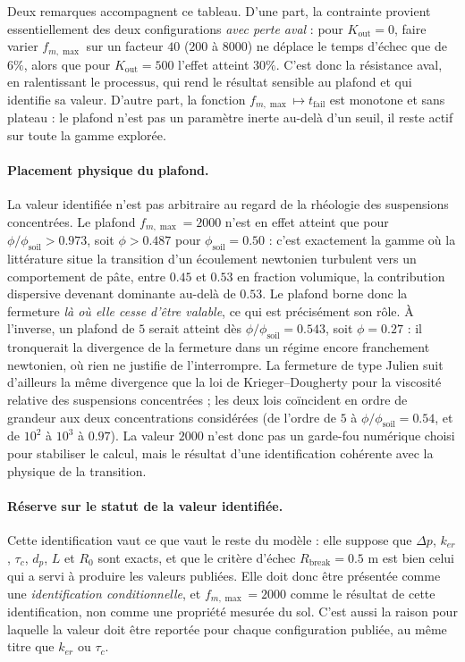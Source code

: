 \documentclass[11pt,a4paper]{report}
\newcommand{\phisol}{\phi_{\mathrm{soil}}}
\newcommand{\kout}{K_{\mathrm{out}}}
\begin{document}
Deux remarques accompagnent ce tableau. D'une part, la contrainte provient essentiellement des deux
configurations \emph{avec perte aval} : pour \(\kout = 0\), faire varier \(f_{m,\max}\) sur un facteur
\(40\) (\(200\) à \(8000\)) ne déplace le temps d'échec que de \(6\%\), alors que pour \(\kout = 500\)
l'effet atteint \(30\%\). C'est donc la résistance aval, en ralentissant le processus, qui rend le résultat
sensible au plafond et qui identifie sa valeur. D'autre part, la fonction \(f_{m,\max} \mapsto
t_{\mathrm{fail}}\) est monotone et sans plateau : le plafond n'est pas un paramètre inerte au-delà d'un
seuil, il reste actif sur toute la gamme explorée.

\paragraph{Placement physique du plafond.} La valeur identifiée n'est pas arbitraire au regard de la
rhéologie des suspensions concentrées. Le plafond \(f_{m,\max} = 2000\) n'est en effet atteint que pour
\(\phi/\phisol > 0.973\), soit \(\phi > 0.487\) pour \(\phisol = 0.50\) : c'est exactement la gamme où la
littérature situe la transition d'un écoulement newtonien turbulent vers un comportement de pâte, entre
\(0.45\) et \(0.53\) en fraction volumique, la contribution dispersive devenant dominante au-delà de
\(0.53\). Le plafond borne donc la fermeture \emph{là où elle cesse d'être valable}, ce qui est
précisément son rôle. À l'inverse, un plafond de \(5\) serait atteint dès \(\phi/\phisol = 0.543\), soit
\(\phi = 0.27\) : il tronquerait la divergence de la fermeture dans un régime encore franchement
newtonien, où rien ne justifie de l'interrompre. La fermeture de type Julien suit d'ailleurs la même
divergence que la loi de Krieger--Dougherty pour la viscosité relative des suspensions concentrées ; les
deux lois coïncident en ordre de grandeur aux deux concentrations considérées (de l'ordre de \(5\) à
\(\phi/\phisol = 0.54\), et de \(10^{2}\) à \(10^{3}\) à \(0.97\)). La valeur \(2000\) n'est donc pas un
garde-fou numérique choisi pour stabiliser le calcul, mais le résultat d'une identification cohérente avec
la physique de la transition.

\paragraph{Réserve sur le statut de la valeur identifiée.} Cette identification vaut ce que vaut le reste
du modèle : elle suppose que \(\Delta p\), \(k_{er}\), \(\tau_c\), \(d_p\), \(L\) et \(R_0\) sont exacts, et
que le critère d'échec \(R_{\mathrm{break}} = 0.5\) m est bien celui qui a servi à produire les valeurs
publiées. Elle doit donc être présentée comme une \emph{identification conditionnelle}, et
\(f_{m,\max} = 2000\) comme le résultat de cette identification, non comme une propriété mesurée du sol.
C'est aussi la raison pour laquelle la valeur doit être reportée pour chaque configuration publiée, au
même titre que \(k_{er}\) ou \(\tau_c\).
\end{document}
